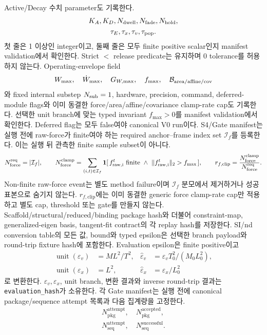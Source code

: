 \documentclass[10pt]{article}
\newcommand{\code}[1]{{\small\nolinkurl{#1}}}
\begin{document}
Active/Decay 수치 parameter도 기록한다.
\[
\begin{gathered}
  K_A,K_D,N_{\rm dwell},N_{\rm fade},N_{\rm hold},\\
  \tau_E,\tau_x,\tau_v,\tau_{\rm pop}.
\end{gathered}
\]
첫 줄은 1 이상인 integer이고, 둘째 줄은 모두 finite positive scalar인지
manifest validation에서 확인한다. Strict \(<\) release predicate는 유지하며 0 tolerance를 허용하지 않는다.
Operating-envelope field
\[
  W_{\max},\quad \dot W_{\max},\quad G_{W,\max},\quad f_{\max},\quad
  \mathcal B_{\rm area/affine/cov}
\]
와 fixed internal substep \(N_{\rm sub}=1\), hardware, precision, command,
deferred-module flags와 이미 동결한 force/area/affine/covariance clamp-rate cap도 기록한다.
선택한 unit branch에 맞는 typed invariant \(f_{\max}>0\)를 manifest validation에서 확인한다.
Deferred flag는 모두 false여야 canonical V0 run이다.
S4/Gate manifest는 실행 전에 raw-force가 finite여야 하는 required anchor--frame index set
\(\mathcal I_f\)를 등록한다. 이는 실행 뒤 관측한 finite sample subset이 아니다.
\[
  N_{\rm force}^{\rm req}=|\mathcal I_f|,\qquad
  N_{\rm force}^{\rm clamp}
  =\sum_{(i,t)\in\mathcal I_f}
  \mathbf 1[\,f_{\rm raw,i}^t\text{ finite}\ \land\
  \|f_{\rm raw,i}^t\|_2>f_{\max}\,],\qquad
  r_{f,\mathrm{clip}}=\frac{N_{\rm force}^{\rm clamp}}{N_{\rm force}^{\rm req}}.
\]
Non-finite raw-force event는 별도 method failure이며 \(\mathcal I_f\) 분모에서 제거하거나
성공 표본으로 숨기지 않는다. \(r_{f,\mathrm{clip}}\)에는 이미 동결한 generic force
clamp-rate cap만 적용하고 별도 cap, threshold 또는 gate를 만들지 않는다.
Scaffold/structural/reduced/binding package hash와 더불어 constraint-map,
generalized-eigen basis, tangent-fit contract의 각 replay hash를 저장한다.
SI/nd conversion table의 모든 값, bound와 typed epsilon은 선택한 branch payload와
round-trip fixture hash에 포함한다. Evaluation epsilon은 finite positive이고
\[
\begin{aligned}
  \operatorname{unit}(\varepsilon_v)&=ML^2/T^2,&
  \widehat\varepsilon_v&=\varepsilon_vT_0^2/(M_0L_0^2),\\
  \operatorname{unit}(\varepsilon_x)&=L^2,&
  \widehat\varepsilon_x&=\varepsilon_x/L_0^2
\end{aligned}
\]
로 변환한다. \(\varepsilon_v,\varepsilon_x\), unit branch, 변환 결과와 inverse
round-trip 결과는 \code{evaluation\_hash}가 소유한다.
각 Gate manifest는 실행 전에 canonical package/sequence attempt 목록과 다음 집계량을 고정한다.
\[
\begin{gathered}
N_{\mathrm{pkg}}^{\mathrm{attempt}},\quad N_{\mathrm{pkg}}^{\mathrm{accepted}},\\
N_{\mathrm{seq}}^{\mathrm{attempt}},\quad N_{\mathrm{seq}}^{\mathrm{successful}}.
\end{gathered}
\]
\end{document}
